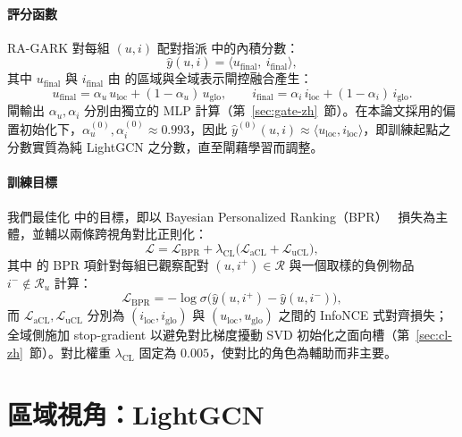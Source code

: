 \paragraph{評分函數} RA-GARK 對每組 $(u, i)$ 配對指派  中的內積分數：
\begin{equation}
\label{eq:score-zh}
\hat{y}(u, i) = \langle u_{\mathrm{final}},\ i_{\mathrm{final}} \rangle,
\end{equation}
其中 $u_{\mathrm{final}}$ 與 $i_{\mathrm{final}}$ 由  的區域與全域表示閘控融合產生：
\begin{equation}
\label{eq:fusion-zh}
u_{\mathrm{final}} = \alpha_u\, u_{\mathrm{loc}} + (1 - \alpha_u)\, u_{\mathrm{glo}}, \qquad
i_{\mathrm{final}} = \alpha_i\, i_{\mathrm{loc}} + (1 - \alpha_i)\, i_{\mathrm{glo}}.
\end{equation}
閘輸出 $\alpha_u, \alpha_i$ 分別由獨立的 MLP 計算（第~\ref{sec:gate-zh}~節）。在本論文採用的偏置初始化下，$\alpha_u^{(0)}, \alpha_i^{(0)} \approx 0.993$，因此 $\hat{y}^{(0)}(u, i) \approx \langle u_{\mathrm{loc}}, i_{\mathrm{loc}} \rangle$，即訓練起點之分數實質為純 LightGCN 之分數，直至閘藉學習而調整。

\paragraph{訓練目標} 我們最佳化  中的目標，即以 Bayesian Personalized Ranking（BPR）~\cite{rendle2009bpr} 損失為主體，並輔以兩條跨視角對比正則化：
\begin{equation}
\label{eq:total-loss-zh}
\mathcal{L} = \mathcal{L}_{\mathrm{BPR}} + \lambda_{\mathrm{CL}} \bigl( \mathcal{L}_{\mathrm{aCL}} + \mathcal{L}_{\mathrm{uCL}} \bigr),
\end{equation}
其中  的 BPR 項針對每組已觀察配對 $(u, i^+) \in \mathcal{R}$ 與一個取樣的負例物品 $i^- \notin \mathcal{R}_u$ 計算：
\begin{equation}
\label{eq:bpr-zh}
\mathcal{L}_{\mathrm{BPR}} = - \log \sigma\bigl( \hat{y}(u, i^+) - \hat{y}(u, i^-) \bigr),
\end{equation}
而 $\mathcal{L}_{\mathrm{aCL}}, \mathcal{L}_{\mathrm{uCL}}$ 分別為 $(i_{\mathrm{loc}}, i_{\mathrm{glo}})$ 與 $(u_{\mathrm{loc}}, u_{\mathrm{glo}})$ 之間的 InfoNCE 式對齊損失；全域側施加 stop-gradient 以避免對比梯度擾動 SVD 初始化之面向槽（第~\ref{sec:cl-zh}~節）。對比權重 $\lambda_{\mathrm{CL}}$ 固定為 $0.005$，使對比的角色為輔助而非主要。

\section{區域視角：LightGCN}
\label{sec:local-zh}

